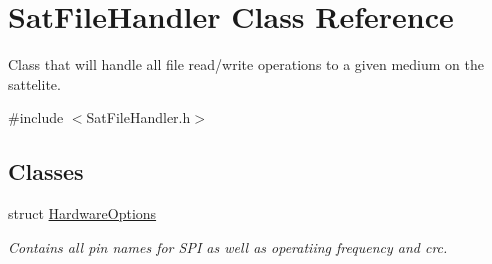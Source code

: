 \hypertarget{class_sat_file_handler}{}\section{Sat\+File\+Handler Class Reference}
\label{class_sat_file_handler}


Class that will handle all file read/write operations to a given medium on the sattelite.  




{\ttfamily \#include $<$Sat\+File\+Handler.\+h$>$}

\subsection*{Classes}
\begin{DoxyCompactItemize}
\item 
struct \mbox{\hyperlink{struct_sat_file_handler_1_1_hardware_options}{Hardware\+Options}}
\begin{DoxyCompactList}\small\item\em Contains all pin names for S\+PI as well as operatiing frequency and crc. \end{DoxyCompactList}\end{DoxyCompactItemize}

